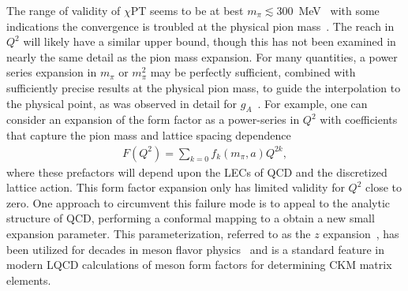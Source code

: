 \documentclass{ar-1col}
\begin{document}
The range of validity of $\chi$PT seems to be at best $m_\pi\lesssim300$~MeV~\cite{Beane:2004ks,Walker-Loud:2008rui} with some indications the convergence is troubled at the physical pion mass~\cite{Walker-Loud:2019cif,Drischler:2019xuo}.
The reach in $Q^2$ will likely have a similar upper bound, though this has not been examined in nearly the same detail as the pion mass expansion.
For many quantities, a power series expansion in $m_\pi$ or $m_\pi^2$ may be perfectly sufficient, combined with sufficiently precise results at the physical pion mass, to guide the interpolation to the physical point, as was observed in detail for $g_A$~\cite{Chang:2018uxx}.
For example, one can consider an expansion of the form factor as a power-series in $Q^2$ with coefficients that capture the pion mass and lattice spacing dependence
\begin{align}\label{eq:F_Q_power}
F(Q^2) = \sum_{k=0} f_k(m_\pi, a) Q^{2k},
\end{align}
where these prefactors will depend upon the LECs of QCD and the discretized lattice action.
This form factor expansion only has limited validity for $Q^2$ close to zero.
One approach to circumvent this failure mode is to appeal to the analytic structure of QCD,
performing a conformal mapping to a obtain a new small expansion parameter.
This parameterization, referred to as the $z$ expansion~\cite{Bhattacharya:2011ah},
has been utilized for decades in meson flavor physics~\cite{Okubo:1971jf}
and is a standard feature in modern LQCD calculations of meson form factors
for determining CKM matrix elements.
\end{document}
